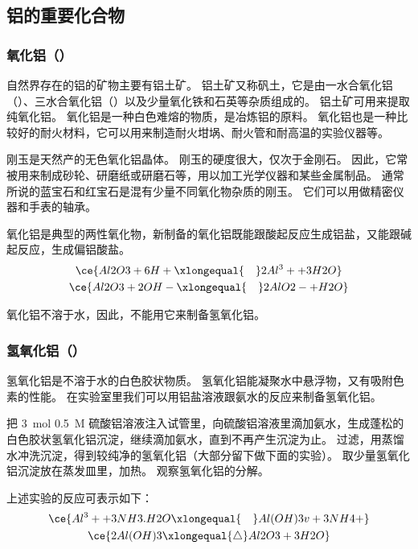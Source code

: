 \subsection{铝的重要化合物}
\subsubsection{氧化铝（）}
自然界存在的铝的矿物主要有铝土矿。
铝土矿又称矾土，它是由一水合氧化铝（）、三水合氧化铝（）以及少量氧化铁和石英等杂质组成的。
铝土矿可用来提取纯氧化铝。
氧化铝是一种白色难熔的物质，是冶炼铝的原料。
氧化铝也是一种比较好的耐火材料，它可以用来制造耐火坩埚、耐火管和耐高温的实验仪器等。

\begin{Reading}[补充阅读]{}
刚玉是天然产的无色氧化铝晶体。
刚玉的硬度很大，仅次于金刚石。
因此，它常被用来制成砂轮、研磨纸或研磨石等，用以加工光学仪器和某些金属制品。
通常所说的蓝宝石和红宝石是混有少量不同氧化物杂质的刚玉。
它们可以用做精密仪器和手表的轴承。
\end{Reading}

氧化铝是典型的两性氧化物，新制备的氧化铝既能跟酸起反应生成铝盐，又能跟碱起反应，生成偏铝酸盐。
\begin{gather*}
  \ce{  Al2O3 + 6H+ \xlongequal{\quad} 2Al^3+ + 3H2O}\\
  \ce{  Al2O3 + 2OH- \xlongequal{\quad} 2AlO2- + H2O}
\end{gather*}

氧化铝不溶于水，因此，不能用它来制备氢氧化铝。

\subsubsection{氢氧化铝（）}
氢氧化铝是不溶于水的白色胶状物质。
氢氧化铝能凝聚水中悬浮物，又有吸附色素的性能。
在实验室里我们可以用铝盐溶液跟氨水的反应来制备氢氧化铝。

\begin{Experiment}
  把 \qty{3}{mol} \qty{0.5}{M} 硫酸铝溶液注入试管里，向硫酸铝溶液里滴加氨水，生成蓬松的白色胶状氢氧化铝沉淀，继续滴加氨水，直到不再产生沉淀为止。
过滤，用蒸馏水冲洗沉淀，得到较纯净的氢氧化铝（大部分留下做下面的实验）。
取少量氢氧化铝沉淀放在蒸发皿里，加热。
观察氢氧化铝的分解。
\end{Experiment}
上述实验的反应可表示如下：
\begin{gather*}
  \ce{ Al^3+ +3NH3.H2O \xlongequal{\quad} Al(OH)3 v + 3NH4+ }\\
  \ce{ 2Al(OH)3 \xlongequal{\triangle} Al2O3 +3H2O }
\end{gather*}

